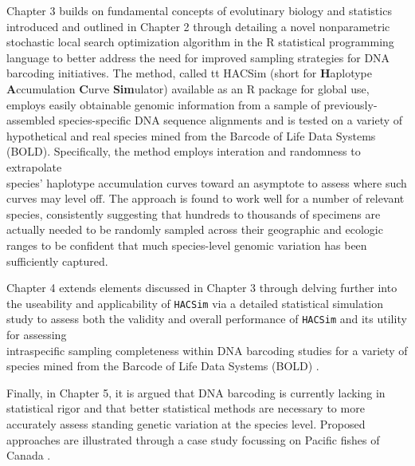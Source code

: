 \vspace{5mm}

Chapter 3 builds on fundamental concepts of evolutinary biology and statistics \\ introduced and outlined in Chapter 2 through detailing a novel nonparametric stochastic local search optimization algorithm in the R statistical programming language to better address the need for improved sampling strategies for DNA barcoding initiatives. The method, called {tt HACSim} (short for \textbf{H}aplotype \textbf{A}ccumulation \textbf{C}urve \textbf{Sim}ulator) available as an R package for global use, employs easily obtainable genomic information from a sample of previously-assembled species-specific DNA sequence alignments and is tested on a variety of hypothetical and real species mined from the Barcode of Life Data Systems (BOLD). Specifically, the method employs interation and randomness to extrapolate \\ species' haplotype accumulation curves toward an asymptote to assess where such curves may level off. The approach is found to work well for a number of relevant species, consistently suggesting that hundreds to thousands of specimens are actually needed to be randomly sampled across their geographic and ecologic ranges to be confident that much species-level genomic variation has been sufficiently captured.  


\vspace{5mm}

Chapter 4 extends elements discussed in Chapter 3 through delving further into the useability and applicability of {\tt HACSim} via a detailed statistical simulation study to assess both the validity and overall performance of {\tt HACSim} and its utility for assessing \\ intraspecific sampling completeness within DNA barcoding studies for a variety of species mined from the Barcode of Life Data Systems (BOLD) \cite{ratnasingham2007bold}.

\vspace{5mm}

Finally, in Chapter 5, it is argued that DNA barcoding is currently lacking in statistical rigor and that better statistical methods are necessary to more accurately assess standing genetic variation at the species level. Proposed approaches are illustrated through a case study focussing on Pacific fishes of Canada \cite{steinke2009dna}.

\vspace{5mm}

